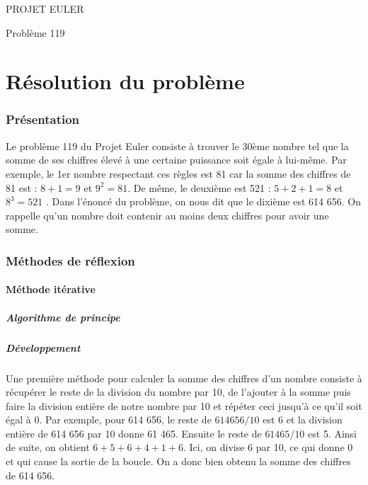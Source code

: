 \documentclass{article}
\newcommand{\code}[3]{}
\begin{document}
\hfill
\hfill
\hfill
\begin{center}
  \large{PROJET EULER}

  Problème 119
\end{center}
\tableofcontents
\part {Résolution du problème}
\section {Présentation}

Le problème 119 du Projet Euler consiste à trouver le 30ème nombre tel que la somme de ses chiffres élevé à une certaine puissance soit égale à lui-même. Par exemple, le 1er nombre respectant ces règles est 81 car la somme des chiffres de 81 est : $ 8 + 1 = 9 $ et $ 9^{2} = 81 $. De même, le deuxième est 521 : $ 5 + 2 + 1 = 8 $ et $ 8^{3} = 521 $	. Dans l'énoncé du problème, on nous dit que le dixième est 614 656. On rappelle qu'un nombre doit contenir au moins deux chiffres pour avoir une somme.

\section{Méthodes de réflexion}

\subsection{Méthode itérative}

\subsubsection{Algorithme de principe}
\code{1}{12}{problem119_1_principe.txt}
\code{1}{9}{SommeChiffreNombre.txt}

\subsubsection{Développement}
Une première méthode pour calculer la somme des chiffres d'un nombre consiste à récupérer le reste de la division du nombre par 10, de l'ajouter à la somme puis faire la division entière de notre nombre par 10 et répéter ceci jusqu'à ce qu'il soit égal à 0. Par exemple, pour 614 656, le reste de $614656/10$ est 6 et la division entière de 614 656 par 10 donne 61 465. Ensuite le reste de $61465/10$ est 5. Ainsi de suite, on obtient $6 + 5 + 6 + 4 + 1 + 6$. Ici, on divise 6 par 10, ce qui donne 0 et qui cause la sortie de la boucle. On a donc bien obtenu la somme des chiffres de 614 656.
\end{document}
